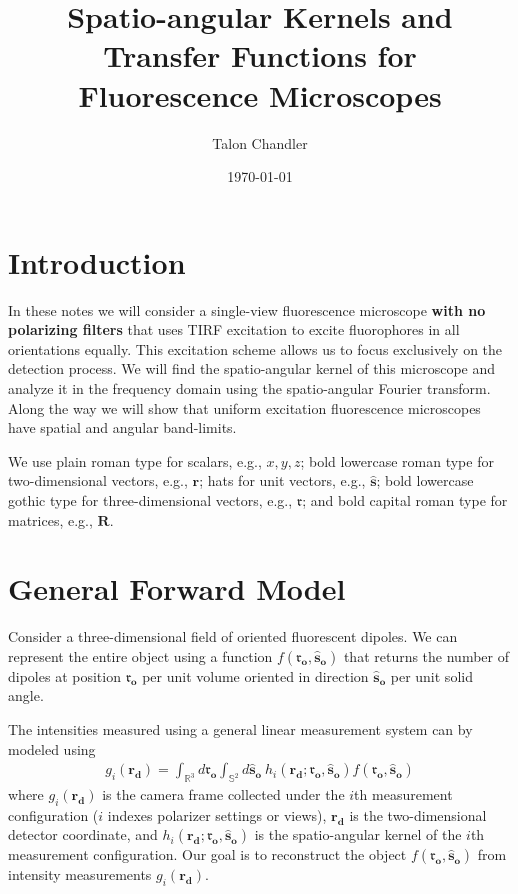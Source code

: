 \documentclass[11pt]{article}
\providecommand{\mb}[1]{\mathbf{#1}}
\providecommand{\ro}[1]{\mathbf{\mathfrak{r}_o}}
\providecommand{\so}[1]{\mathbf{\hat{s}_o}}
\providecommand{\rd}[1]{\mathbf{r_d}}
\begin{document}
\title{\vspace{-2.5em} Spatio-angular Kernels and Transfer Functions for Fluorescence Microscopes \vspace{-2.5em}} \author{Talon Chandler}%
\date{\vspace{-1em}\today\vspace{-1em}}
\maketitle
\section{Introduction}
In these notes we will consider a single-view fluorescence microscope
\textbf{with no polarizing filters} that uses TIRF excitation to excite
fluorophores in all orientations equally. This excitation scheme allows us to
focus exclusively on the detection process. We will find the spatio-angular
kernel of this microscope and analyze it in the frequency domain using the
spatio-angular Fourier transform. Along the way we will show that uniform
excitation fluorescence microscopes have spatial and angular band-limits.

We use plain roman type for scalars, e.g., $x, y, z$; bold lowercase roman type
for two-dimensional vectors, e.g., $\mb{r}$; hats for unit vectors, e.g.,
$\mb{\hat{s}}$; bold lowercase gothic type for three-dimensional vectors, e.g.,
$\mb{\mathfrak{r}}$; and bold capital roman type for matrices, e.g., $\mb{R}$.

\section{General Forward Model}
Consider a three-dimensional field of oriented fluorescent dipoles. We can
represent the entire object using a function $f(\ro{}, \so{})$ that
returns the number of dipoles at position $\ro{}$ per unit volume oriented in
direction $\so{}$ per unit solid angle. 

The intensities measured using a general linear measurement system can by
modeled using
\begin{align}
  g_i(\rd{}) = \int_{\mathbb{R}^3}d\ro{} \int_{\mathbb{S}^2}d\so{}\ h_i(\rd{}; \ro{}, \so{})f(\ro{}, \so{})
\end{align}
where $g_i(\mb{r_d})$ is the camera frame collected under the $i$th measurement
configuration ($i$ indexes polarizer settings or views), $\mb{r_d}$ is the
two-dimensional detector coordinate, and
$h_i(\rd{}; \ro{}, \so{})$ is the spatio-angular kernel of the
$i$th measurement configuration. Our goal is to reconstruct the object
$f(\ro{}, \so{})$ from intensity measurements $g_i(\rd{})$.
\end{document}
